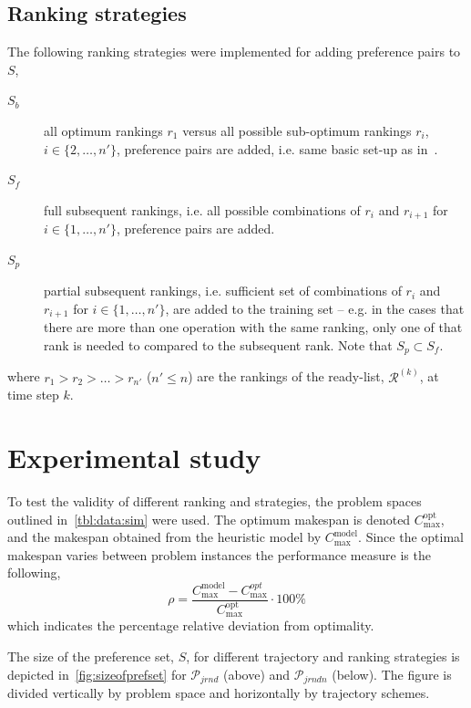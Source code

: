 \documentclass[letterpaper]{article}
\begin{document}
\subsection{Ranking strategies}\label{sec:ranks}
The following ranking strategies were implemented for adding preference pairs to $S$,
\begin{description}
\item[$S_b$] all optimum rankings $r_1$ versus all possible sub-optimum rankings $r_i$, $i\in\{2,\ldots,n'\}$, preference pairs are added, i.e. same basic set-up as in~\cite{InRu11a}. %
\item[$S_f$] full subsequent rankings, i.e. all possible combinations of $r_i$ and $r_{i+1}$ for $i\in\{1,\ldots,n'\}$, preference pairs are added.
\item[$S_p$] partial subsequent rankings, i.e. sufficient set of combinations of $r_i$ and $r_{i+1}$ for $i\in\{1,\ldots,n'\}$, are added to the training set -- e.g. in the cases that there are more than one operation with the same ranking, only one of that rank is needed to compared to the subsequent rank. Note that $S_p\subset S_f$.
\end{description}
where $r_1>r_2>\ldots>r_{n'}$ ($n'\leq n$) are the rankings of the ready-list, $\mathcal{R}^{(k)}$, at time step $k$.


\section{Experimental study}\label{sec:expr}
To test the validity of different ranking and strategies, the problem spaces outlined in~\cref{tbl:data:sim} were used. The optimum makespan is denoted 
$C_{\max}^{\text{opt}}$, and the makespan obtained from the heuristic model by $C_{\max}^{\text{model}}$. Since 
the optimal makespan varies between problem instances the performance measure is the following, 
\begin{equation}\label{eq:ratio}\rho=\frac{C_{\max}^{\text{model}}-C_{\max}^{opt}}{C_{\max}^{\text{opt}}}\cdot 
100\%\end{equation}
which indicates the percentage relative deviation from optimality. 

The size of the preference set, $S$, for different trajectory and ranking strategies is depicted in~\cref{fig:sizeofprefset} for $\mathcal{P}_{jrnd}$ (above) and $\mathcal{P}_{jrndn}$ (below). 
The figure is divided vertically by problem space and horizontally by trajectory schemes.
 
\end{document}
